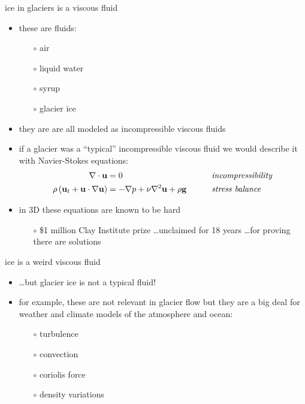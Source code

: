 \documentclass{beamer}
\begin{document}
\begin{frame}{ice in glaciers is a viscous fluid}

\begin{itemize}
\item these are fluids:
  \begin{itemize}
  \item[$\circ$] air
  \item[$\circ$] liquid water
  \item[$\circ$] syrup
  \item[$\circ$] glacier ice
  \end{itemize}
\item they are are all modeled as \alert{incompressible viscous fluids}
\item if a glacier was a ``typical'' incompressible viscous fluid we would describe it with Navier-Stokes equations:
\begin{align*}
\nabla \cdot \mathbf{u} &= 0 &&\qquad \text{\emph{incompressibility}} \\
\rho \left(\mathbf{u}_t + \mathbf{u}\cdot\nabla \mathbf{u}\right) &= -\nabla p + \nu \nabla^2 \mathbf{u} + \rho \mathbf{g} &&\qquad \text{\emph{stress balance}}
\end{align*}
\item in 3D these equations are known to be hard
  \begin{itemize}
  \item[$\circ$] \$1 million Clay Institute prize \dots unclaimed for 18 years \dots for proving there are solutions
  \end{itemize}
\end{itemize}
\end{frame}



\begin{frame}{ice is a weird viscous fluid}

\begin{itemize}
\item \dots but glacier ice is not a typical fluid!
\item for example, these are not relevant in glacier flow but they are a big deal for weather and climate models of the atmosphere and ocean:
  \begin{itemize}
  \item[$\circ$] turbulence
  \item[$\circ$] convection
  \item[$\circ$] coriolis force
  \item[$\circ$] density variations
  \end{itemize}
\end{itemize}
\end{frame}
\end{document}
